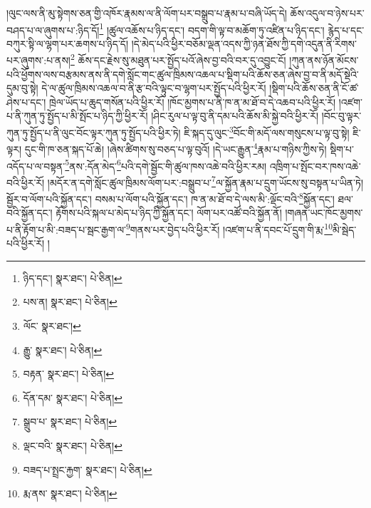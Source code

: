 །ལུང་ལས་ནི་མུ་སྟེགས་ཅན་གྱི་འཁོར་རྣམས་ལ་ནི་ལོག་པར་བསྒྲུབ་པ་རྣམ་པ་བཞི་ཡོད་དེ། ཆོས་འདུལ་བ་ཉེས་པར་བཤད་པ་ལ་ཞུགས་པ་:ཉིད་དོ།\footnote{ཉིད་དང་།  སྣར་ཐང་།  པེ་ཅིན། } །ཚུལ་འཆོས་པ་ཉིད་དང་། བདག་གི་ལྟ་བ་མཆོག་ཏུ་འཛིན་པ་ཉིད་དང་། རྙེད་པ་དང་བཀུར་སྟི་ལ་ལྷག་པར་ཆགས་པ་ཉིད་དོ། །དེ་མེད་པའི་ཕྱིར་བཅོམ་ལྡན་འདས་ཀྱི་ཉན་ཐོས་ཀྱི་དགེ་འདུན་ནི་རིགས་པར་ཞུགས་:པ་ནས།\footnote{པས་ན།  སྣར་ཐང་།  པེ་ཅིན། } ཆོས་དང་རྗེས་སུ་མཐུན་པར་སྤྱོད་པའོ་ཞེས་བྱ་བའི་བར་དུ་འབྱུང་ངོ། །ཀུན་ནས་ཉོན་མོངས་པའི་ཕྱོགས་ལས་བརྩམས་ནས་ནི་དགེ་སློང་གང་ཚུལ་ཁྲིམས་འཆལ་པ་སྡིག་པའི་ཆོས་ཅན་ཞེས་བྱ་བ་ནི་མདོ་སྡེའི་དུམ་བུ་སྟེ། དེ་ལ་ཚུལ་ཁྲིམས་འཆལ་བ་ནི་རྩ་བའི་ལྟུང་བ་ལྷག་པར་སྤྱོད་པའི་ཕྱིར་རོ། །སྡིག་པའི་ཆོས་ཅན་ནི་ངོ་ཚ་ཤེས་པ་དང་། ཁྲེལ་ཡོད་པ་ཆུད་གསོན་པའི་ཕྱིར་རོ། །ཁོང་མྱགས་པ་ནི་ཁ་ན་མ་ཐོ་བ་དེ་འཆབ་པའི་ཕྱིར་རོ། །འཛག་པ་ནི་ཀུན་ཏུ་སྤྱོད་པ་མི་སྤོང་པ་ཉིད་ཀྱི་ཕྱིར་རོ། །ཤིང་རུལ་པ་ལྟ་བུ་ནི་དམ་པའི་ཆོས་མི་སྐྱེ་བའི་ཕྱིར་རོ། །བོང་བུ་ལྟར་ཀུན་ཏུ་སྤྱོད་པ་ནི་ལུང་བོང་ལྟར་ཀུན་ཏུ་སྤྱོད་པའི་ཕྱིར་ཏེ། ཇི་སྐད་དུ་ལུང་\footnote{ལོང་  སྣར་ཐང་། }བོང་གི་མདོ་ལས་གསུངས་པ་ལྟ་བུ་སྟེ། ཇི་ལྟར། དུང་གི་ཁ་ཅན་སྐད་པོ་ཆེ། །ཞེས་ཚིགས་སུ་བཅད་པ་ལྟ་བུའོ། །དེ་ཡང་རྒྱུན་\footnote{རྒྱུ་  སྣར་ཐང་།  པེ་ཅིན། }རྣམ་པ་གཉིས་ཀྱིས་ཏེ། སྡིག་པ་འདོད་པ་ལ་བསྟན་\footnote{བརྟན་  སྣར་ཐང་།  པེ་ཅིན། }ནས་:དོན་མེད་\footnote{དོན་དམ་  སྣར་ཐང་།  པེ་ཅིན། }པའི་དགེ་སྦྱོང་གི་ཚུལ་ཁས་འཆེ་བའི་ཕྱིར་རམ། འཁྲིག་པ་སྤོང་བར་ཁས་འཆེ་བའི་ཕྱིར་རོ། །མདོར་ན་དགེ་སློང་ཚུལ་ཁྲིམས་ལོག་པར་:བསྒྲུབ་པ་\footnote{སྒྲུབ་པ་  སྣར་ཐང་།  པེ་ཅིན། }ལ་སྐྱོན་རྣམ་པ་དྲུག་ཡོངས་སུ་བསྟན་པ་ཡིན་ཏེ། སྦྱོར་བ་ལོག་པའི་སྐྱོན་དང་། བསམ་པ་ལོག་པའི་སྐྱོན་དང་། ཁ་ན་མ་ཐོ་བ་དེ་ལས་མི་:ལྡོང་བའི་\footnote{ལྡང་བའི་  སྣར་ཐང་།  པེ་ཅིན། }སྐྱོན་དང་། ཐལ་བའི་སྐྱོན་དང་། རྟོགས་པའི་སྐལ་པ་མེད་པ་ཉིད་ཀྱི་སྐྱོན་དང་། ལོག་པར་འཚོ་བའི་སྐྱོན་ནོ། །གཞན་ཡང་ཁོང་མྱགས་པ་ནི་རྟོག་པ་མི་:བཟད་པ་སྦང་རྒྱག་ལ་\footnote{བཟད་པ་སྤྲང་རྐྱག་  སྣར་ཐང་།  པེ་ཅིན། }གནས་པར་བྱེད་པའི་ཕྱིར་རོ། །འཛག་པ་ནི་དབང་པོ་དྲུག་གི་རྨ་\footnote{རྨ་ནས་  སྣར་ཐང་།  པེ་ཅིན། }མི་སྦེད་པའི་ཕྱིར་རོ། །

